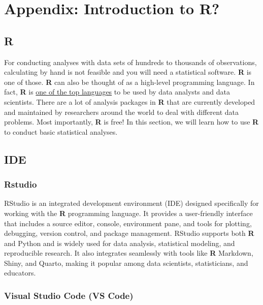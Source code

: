 \documentclass[
  letterpaper,
  DIV=11,
  numbers=noendperiod]{scrreprt}
\begin{document}
{\chapter{Appendix: Introduction to R?}\label{appendix-introduction-to-r}

\section{R}\label{r}

For conducting analyses with data sets of hundreds to thousands of
observations, calculating by hand is not feasible and you will need a
statistical software. \textbf{R} is one of those. \textbf{R} can also be
thought of as a high-level programming language. In fact, \textbf{R} is
\href{https://statisticstimes.com/tech/top-computer-languages.php}{one
of the top languages} to be used by data analysts and data scientists.
There are a lot of analysis packages in \textbf{R} that are currently
developed and maintained by researchers around the world to deal with
different data problems. Most importantly, \textbf{R} is free! In this
section, we will learn how to use \textbf{R} to conduct basic
statistical analyses.

\section{IDE}\label{ide}

\subsection{Rstudio}\label{rstudio}

RStudio is an integrated development environment (IDE) designed
specifically for working with the \textbf{R} programming language. It
provides a user-friendly interface that includes a source editor,
console, environment pane, and tools for plotting, debugging, version
control, and package management. RStudio supports both \textbf{R} and
Python and is widely used for data analysis, statistical modeling, and
reproducible research. It also integrates seamlessly with tools like
\textbf{R} Markdown, Shiny, and Quarto, making it popular among data
scientists, statisticians, and educators.

\subsection{Visual Studio Code (VS
Code)}\label{visual-studio-code-vs-code}

}
\end{document}
